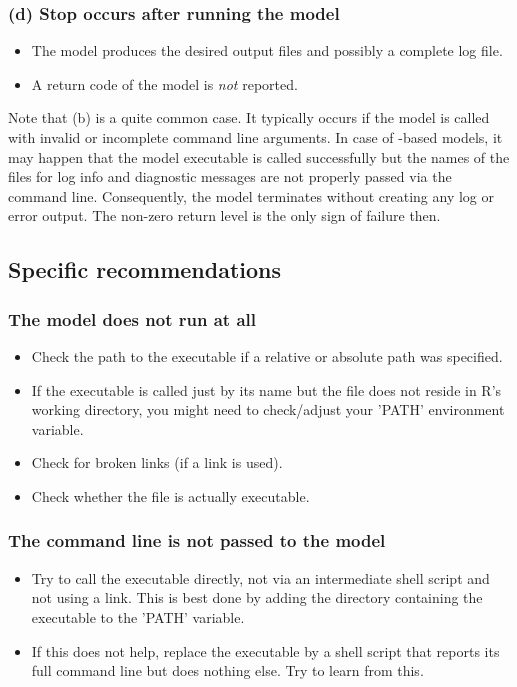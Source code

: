 \subsubsection*{(d) Stop occurs after running the model}
\begin{itemize}
  \item The model produces the desired output files and possibly a complete log file.
  \item A return code of the model is \emph{not} reported.
\end{itemize}

Note that (b) is a quite common case. It typically occurs if the model is called with invalid or incomplete command line arguments. In case of -based models, it may happen that the model executable is called successfully but the names of the files for log info and diagnostic messages are not properly passed via the command line. Consequently, the model terminates without creating any log or error output. The non-zero return level is the only sign of failure then.

\subsection{Specific recommendations} \label{sec:mops:troubleshooting:specific}

\subsubsection*{The model does not run at all}
\begin{itemize}
  \item Check the path to the executable if a relative or absolute path was specified.
  \item If the executable is called just by its name but the file does not reside in R's working directory, you might need to check/adjust your 'PATH' environment variable.
  \item Check for broken links (if a link is used).
  \item Check whether the file is actually executable.
\end{itemize}

\subsubsection*{The command line is not passed to the model}
\begin{itemize}
  \item Try to call the executable directly, \ie{} not via an intermediate shell script and not using a link. This is best done by adding the directory containing the executable to the 'PATH' variable.
  \item If this does not help, replace the executable by a shell script that reports its full command line but does nothing else. Try to learn from this.
\end{itemize}

